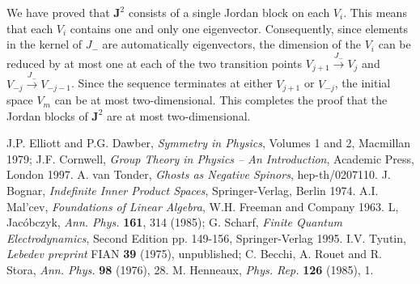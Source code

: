 \documentclass[a4paper,dvips,12pt]{article}
\begin{document}
    We have proved that $\mathbf{J}^2$ consists of a single Jordan
    block on each $V_i$.  This means that each $V_i$ contains one and only one
    eigenvector.  Consequently, since elements in the kernel of
    $J_-$ are automatically eigenvectors, the dimension of the
    $V_i$ can be reduced by at most one at each of the two transition
    points
    $V_{j+1} \stackrel{J_-}{\longrightarrow} V_j$ and
    $V_{-j} \stackrel{J_-}{\longrightarrow} V_{-j-1}$.  Since the
    sequence terminates at either $V_{j+1}$ or $V_{-j}$, the
    initial space $V_m$ can be at most two-dimensional.  This
    completes the proof that the Jordan blocks of $\mathbf{J}^2$ are at most
    two-dimensional.


    \begin{thebibliography}{99}
            J.P. Elliott and P.G. Dawber,
            \textit{Symmetry in Physics}, Volumes 1 and 2, Macmillan
            1979;
            J.F. Cornwell, \textit{Group Theory in Physics -- An
            Introduction}, Academic Press, London 1997.
            A. van Tonder, \textit{Ghosts as Negative Spinors}, hep-th/0207110.
            J. Bognar, \textit{Indefinite Inner Product Spaces},
            Springer-Verlag, Berlin 1974.
            A.I. Mal'cev, \textit{Foundations of Linear Algebra},
            W.H. Freeman and Company 1963.
            L, Jac\'obczyk,
            \textit{Ann. Phys.} \textbf{161}, 314 (1985);
            G. Scharf, \textit{Finite Quantum Electrodynamics}, Second Edition
            pp. 149-156, Springer-Verlag 1995.
            I.V. Tyutin, \textit{Lebedev preprint} FIAN \textbf{39} (1975),
            unpublished;
            C. Becchi, A. Rouet and R. Stora, \textit{Ann. Phys.} \textbf{98} (1976),
            28.
            M. Henneaux, \textit {Phys. Rep.} \textbf{126} (1985), 1.
    \end{thebibliography}
\end{document}
